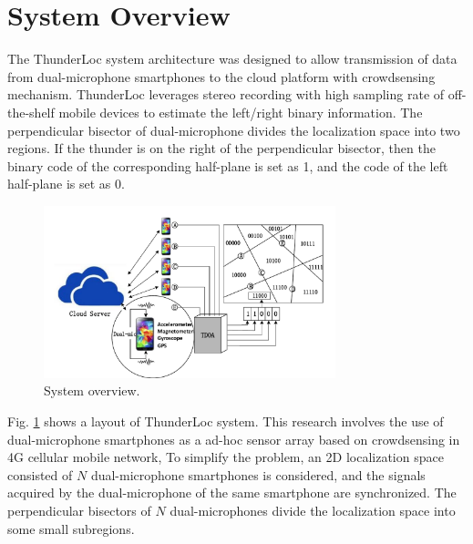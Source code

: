 \section{System Overview}


 The ThunderLoc system architecture was designed to allow transmission of data from dual-microphone smartphones to the cloud platform with crowdsensing mechanism.
 ThunderLoc leverages stereo recording with high sampling rate of off-the-shelf mobile devices to estimate the left/right binary information.
 The perpendicular bisector of dual-microphone divides the localization space into two regions.
 If the thunder is on the right of the perpendicular bisector, then the binary code of the corresponding half-plane is set as 1, 
 and the code of the left half-plane is set as 0.


  \begin{figure}[htb]
            \setlength{\abovecaptionskip}{0pt}
            \centering
            \includegraphics[scale=2,height=5.0cm]{fig/overview.pdf}
			 \vspace{1mm}
            \caption{\label{overview}System overview.}
            \vspace{-4mm}
  \end{figure}
  
 Fig. \ref{overview} shows a layout of ThunderLoc system.  
 This research involves the use of dual-microphone smartphones as a ad-hoc sensor array based on crowdsensing in 4G cellular mobile network,
  To simplify the problem, an 2D localization space consisted of $N$ dual-microphone smartphones is considered,
 and the signals acquired by the dual-microphone of the same smartphone are synchronized.
 The perpendicular bisectors of  $N$ dual-microphones divide the localization space into some small subregions.
 
